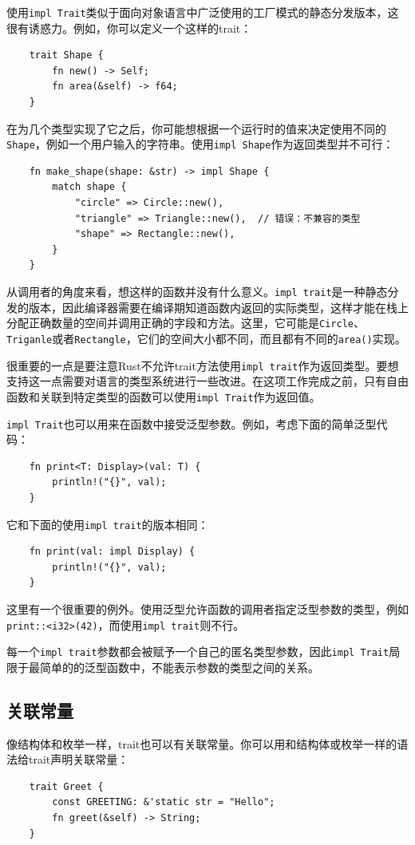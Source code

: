 使用\texttt{impl Trait}类似于面向对象语言中广泛使用的工厂模式的静态分发版本，这很有诱惑力。例如，你可以定义一个这样的trait：
\begin{verbatim}
    trait Shape {
        fn new() -> Self;
        fn area(&self) -> f64;
    }
\end{verbatim}

在为几个类型实现了它之后，你可能想根据一个运行时的值来决定使用不同的\texttt{Shape}，例如一个用户输入的字符串。使用\texttt{impl Shape}作为返回类型并不可行：
\begin{verbatim}
    fn make_shape(shape: &str) -> impl Shape {
        match shape {
            "circle" => Circle::new(),
            "triangle" => Triangle::new(),  // 错误：不兼容的类型
            "shape" => Rectangle::new(),
        }
    }
\end{verbatim}

从调用者的角度来看，想这样的函数并没有什么意义。\texttt{impl trait}是一种静态分发的版本，因此编译器需要在编译期知道函数内返回的实际类型，这样才能在栈上分配正确数量的空间并调用正确的字段和方法。这里，它可能是\texttt{Circle}、\texttt{Triganle}或者\texttt{Rectangle}，它们的空间大小都不同，而且都有不同的\texttt{area()}实现。

很重要的一点是要注意Rust不允许trait方法使用\texttt{impl trait}作为返回类型。要想支持这一点需要对语言的类型系统进行一些改进。在这项工作完成之前，只有自由函数和关联到特定类型的函数可以使用\texttt{impl Trait}作为返回值。

\texttt{impl Trait}也可以用来在函数中接受泛型参数。例如，考虑下面的简单泛型代码：
\begin{verbatim}
    fn print<T: Display>(val: T) {
        println!("{}", val);
    }
\end{verbatim}

它和下面的使用\texttt{impl trait}的版本相同：
\begin{verbatim}
    fn print(val: impl Display) {
        println!("{}", val);
    }
\end{verbatim}

这里有一个很重要的例外。使用泛型允许函数的调用者指定泛型参数的类型，例如\texttt{print::<i32>(42)}，而使用\texttt{impl trait}则不行。

每一个\texttt{impl trait}参数都会被赋予一个自己的匿名类型参数，因此\texttt{impl Trait}局限于最简单的的泛型函数中，不能表示参数的类型之间的关系。

\subsection{关联常量}
像结构体和枚举一样，trait也可以有关联常量。你可以用和结构体或枚举一样的语法给trait声明关联常量：
\begin{verbatim}
    trait Greet {
        const GREETING: &'static str = "Hello";
        fn greet(&self) -> String;
    }
\end{verbatim}

